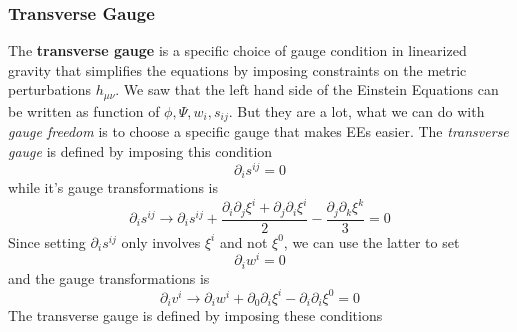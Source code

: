 \subsubsection{Transverse Gauge}

The \textbf{transverse gauge} is a specific choice of gauge condition in linearized gravity that simplifies the equations by imposing constraints on the metric perturbations $h_{\mu \nu }$. 
We saw that the left hand side of the Einstein Equations can be written as function of $\phi ,\Psi ,w_{i},s_{ij}$. But they are a lot, what we can do with \emph{gauge freedom} is to choose a specific gauge that makes EEs easier. The \emph{transverse gauge }is defined by imposing this condition
\[
\partial_{i}s^{ij} = 0	
\]
while it's gauge transformations is 
\[
\partial_{i} s^{ij} \to \partial_{i}s^{ij} + \frac{\partial_{i}\partial_{j}\xi ^{i}+\partial_{j}\partial_{i}\xi ^{i}}{2} - \frac{\partial_{j}\partial_{k}\xi ^{k}}{3} = 0
\]
Since setting $\partial_{i}s^{ij}$ only involves $\xi ^{i}$ and not $\xi ^{0}$, we can use the latter to set
\[
\partial_{i}w^{i} = 0 
\]
and the gauge transformations is
\[
\partial_{i}v^{i} \to \partial_{i}w^{i}+ \partial_{0}\partial_{i}\xi ^{i} - \partial_{i}\partial_{i}\xi ^{0} = 0
\]
The transverse gauge is defined by imposing these conditions

